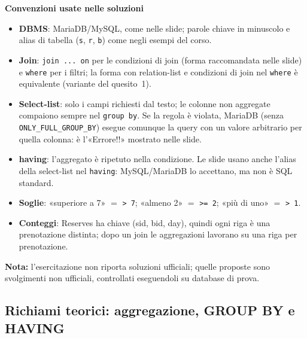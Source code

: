 \documentclass[12pt, a4paper]{article}
\begin{document}
\textbf{Convenzioni usate nelle soluzioni}
\begin{itemize}
\item \textbf{DBMS}: MariaDB/MySQL, come nelle slide; parole chiave in minuscolo e alias di tabella (\texttt{s}, \texttt{r}, \texttt{b}) come negli esempi del corso.
\item \textbf{Join}: \texttt{join ... on} per le condizioni di join (forma raccomandata nelle slide) e \texttt{where} per i filtri; la forma con relation-list e condizioni di join nel \texttt{where} è equivalente (variante del quesito~1).
\item \textbf{Select-list}: solo i campi richiesti dal testo; le colonne non aggregate compaiono sempre nel \texttt{group by}. Se la regola è violata, MariaDB (senza \texttt{ONLY\_FULL\_GROUP\_BY}) esegue comunque la query con un valore arbitrario per quella colonna: è l'«Errore!!» mostrato nelle slide.
\item \textbf{having}: l'aggregato è ripetuto nella condizione. Le slide usano anche l'alias della select-list nel \texttt{having}: MySQL/MariaDB lo accettano, ma non è SQL standard.
\item \textbf{Soglie}: «superiore a 7» $=$ \texttt{> 7}; «almeno 2» $=$ \texttt{>= 2}; «più di uno» $=$ \texttt{> 1}.
\item \textbf{Conteggi}: Reserves ha chiave (sid, bid, day), quindi ogni riga è una prenotazione distinta; dopo un join le aggregazioni lavorano su una riga per prenotazione.
\end{itemize}
\textbf{Nota:} l'esercitazione non riporta soluzioni ufficiali; quelle proposte sono svolgimenti non ufficiali, controllati eseguendoli su database di prova.

\subsection{Richiami teorici: aggregazione, GROUP BY e HAVING}
\end{document}
